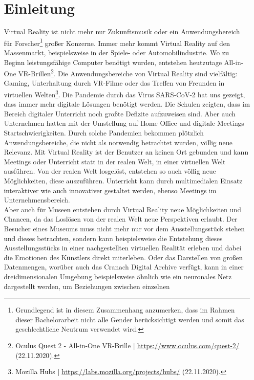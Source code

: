 \documentclass[a4paper,12pt,oneside]{article}
\begin{document}
  \section{Einleitung}
    Virtual Reality ist nicht mehr nur Zukunftsmusik oder ein Anwendungsbereich für Forscher\footnote{Grundlegend ist in diesem Zusammenhang anzumerken, dass im Rahmen dieser Bachelorarbeit nicht alle Gender berücksichtigt werden und somit das geschlechtliche Neutrum verwendet wird.}
    großer Konzerne. Immer mehr kommt Virtual Reality auf den Massenmarkt, beispielsweise
    in der Spiele- oder Automobilindustrie. Wo zu Beginn
    leistungsfähige Computer benötigt wurden, entstehen heutzutage All-in-One VR-Brillen\footnote{Oculus Quest 2 - All-in-One VR-Brille | \url{https://www.oculus.com/quest-2/} (22.11.2020).}.
    Die Anwendungsbereiche von Virtual Reality sind vielfältig: Gaming, Unterhaltung durch VR-Filme oder
    das Treffen von Freunden in virtuellen Welten\footnote{Mozilla Hubs | \url{https://labs.mozilla.org/projects/hubs/} (22.11.2020).}.
    Die Pandemie durch das Virus SARS-CoV-2 hat uns gezeigt, dass immer mehr digitale Lösungen
    benötigt werden. Die Schulen zeigten, dass im Bereich digitaler Unterricht
    noch großte Defizite aufzuweisen sind. Aber auch Unternehmen hatten mit der Umstellung
    auf Home Office und digitale Meetings Startschwierigkeiten.
    Durch solche Pandemien bekommen 
    plötzlich Anwendungsbereiche, die nicht als
    notwendig betrachtet wurden, völlig neue Relevanz.
    Mit Virtual Reality ist der Benutzer 
    an keinen Ort gebunden und kann Meetings oder Unterricht
    statt in der realen Welt, in einer virtuellen Welt ausführen. Von der realen Welt
    losgelöst, entstehen so auch völlig neue Möglichkeiten, diese auszuführen. Unterricht kann
    durch multimedialen Einsatz interaktiver wie auch innovativer gestaltet werden, ebenso
    Meetings im Unternehmensbereich. \\
    Aber auch für Museen entstehen durch Virtual Reality neue Möglichkeiten und Chancen,
    da das Loslösen von der realen Welt neue Perspektiven erlaubt. Der Besucher eines
    Museums muss nicht mehr nur vor dem Ausstellungsstück stehen und dieses betrachten,
    sondern kann beispielsweise die Entstehung dieses Ausstellungsstücks in einer
    nachgestellten virtuellen Realität erleben und dabei die Emotionen des Künstlers
    direkt miterleben. Oder das Darstellen von großen Datenmengen, worüber auch das
    Cranach Digital Archive verfügt, kann in einer dreidimensionalen Umgebung beispielsweise
    ähnlich wie ein neuronales Netz dargestellt werden, um Beziehungen zwischen einzelnen
\end{document}
